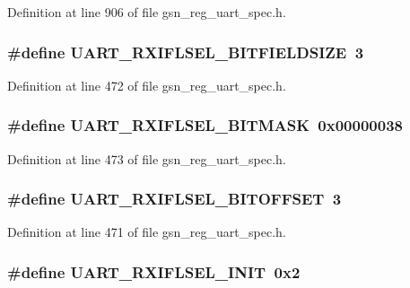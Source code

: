 Definition at line 906 of file gsn\_\-reg\_\-uart\_\-spec.h.

\hypertarget{a00575_adfeab1ffc3e4dcdf19094abe7db25144}{
\subsubsection[{UART\_\-RXIFLSEL\_\-BITFIELDSIZE}]{\setlength{\rightskip}{0pt plus 5cm}\#define UART\_\-RXIFLSEL\_\-BITFIELDSIZE~3}}
\label{a00575_adfeab1ffc3e4dcdf19094abe7db25144}


Definition at line 472 of file gsn\_\-reg\_\-uart\_\-spec.h.

\hypertarget{a00575_ac83c9234bdad69bfa8712761d43f2bb1}{
\subsubsection[{UART\_\-RXIFLSEL\_\-BITMASK}]{\setlength{\rightskip}{0pt plus 5cm}\#define UART\_\-RXIFLSEL\_\-BITMASK~0x00000038}}
\label{a00575_ac83c9234bdad69bfa8712761d43f2bb1}


Definition at line 473 of file gsn\_\-reg\_\-uart\_\-spec.h.

\hypertarget{a00575_ad61e0394aaac9b315bd9090c46e1bcdd}{
\subsubsection[{UART\_\-RXIFLSEL\_\-BITOFFSET}]{\setlength{\rightskip}{0pt plus 5cm}\#define UART\_\-RXIFLSEL\_\-BITOFFSET~3}}
\label{a00575_ad61e0394aaac9b315bd9090c46e1bcdd}


Definition at line 471 of file gsn\_\-reg\_\-uart\_\-spec.h.

\hypertarget{a00575_a411e2296e4cea5901945dbd306bd7675}{
\subsubsection[{UART\_\-RXIFLSEL\_\-INIT}]{\setlength{\rightskip}{0pt plus 5cm}\#define UART\_\-RXIFLSEL\_\-INIT~0x2}}
\label{a00575_a411e2296e4cea5901945dbd306bd7675}


